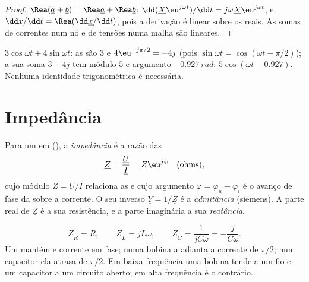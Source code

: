 \begin{proof}
$\Rea(\underline a + \underline b) = \Rea\underline a + \Rea\underline b$;
$\dd(\underline X\eu^{j\omega t})/\dd t = j\omega\underline X\eu^{j\omega t}$,
e $\dd x/\dd t = \Rea(\dd\underline x/\dd t)$, pois a derivação
é linear sobre os reais. As somas de correntes num nó e de tensões numa
malha são lineares.
\end{proof}

\begin{example}\label{ex:b1:sinusoidal-impedance:add}
$3\cos\omega t + 4\sin\omega t$: as  são $3$ e
$4\eu^{-j\pi/2} = -4j$ (pois $\sin\omega t = \cos(\omega t - \pi/2)$);
a sua soma $3 - 4j$ tem módulo $5$ e argumento $-0.927\ \unit{rad}$:
$5\cos(\omega t - 0.927)$. Nenhuma identidade trigonométrica é necessária.
\end{example}

\section{Impedância}

\begin{definition}\label{def:b1:sinusoidal-impedance:impedance}
Para um  em  (), a \emph{impedância} é a razão das 
\[
\underline Z = \frac{\underline U}{\underline I} = Z\eu^{j\varphi}
\quad (\text{ohms}),
\]
cujo módulo $Z = U/I$ relaciona as  e cujo argumento
$\varphi = \varphi_u - \varphi_i$ é o avanço de fase da  sobre
a corrente. O seu inverso $\underline Y = 1/\underline Z$ é a
\emph{admitância} (siemens). A parte real de $\underline Z$ é a sua
resistência, e a parte imaginária a sua \emph{reatância}.
\end{definition}

\begin{proposition}[Impedâncias de R, L, C]\label{prop:b1:sinusoidal-impedance:rlc}
\[
\underline Z_R = R, \qquad \underline Z_L = jL\omega, \qquad
\underline Z_C = \frac{1}{jC\omega} = -\frac{j}{C\omega} .
\]
Um  mantém  e corrente em fase; numa bobina a 
adianta a corrente de $\pi/2$; num capacitor ela atrasa de $\pi/2$. Em baixa
frequência uma bobina tende a um fio e um capacitor a um circuito aberto; em
alta frequência é o contrário.
\end{proposition}

